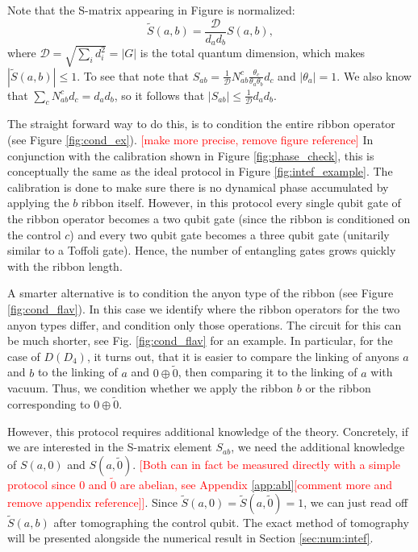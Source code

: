 \documentclass[two column]{article}
\newcommand{\caro}[1]{\textcolor{red}{[#1]}}
\begin{document}
Note that the S-matrix appearing in Figure is normalized:
\begin{equation}
    \tilde{S}(a,b) = \frac{\mathcal D}{d_a d_b}S(a,b),
\end{equation}
where $\mathcal D=\sqrt{\sum_i d_i^2}=|G|$ is the total quantum dimension,
which makes $|\tilde{S}(a,b)| \leq 1$. To see that note that $S_{ab}=\frac{1}{\mathcal D} N_{ab}^c \frac{\theta_c}{\theta_a \theta_b} d_c$ and $|\theta_a|=1$. We also know that $\sum_c N_{ab}^c d_c = d_a d_b$, so it follows that $|S_{ab}| \leq \frac{1}{\mathcal D} d_a d_b$.



The straight forward way to do this, is to condition the entire ribbon operator (see Figure \ref{fig:cond_ex}).  \caro{make more precise, remove figure reference} In conjunction with the calibration shown in Figure \ref{fig:phase_check}, this is conceptually the same as the ideal protocol in Figure \ref{fig:intef_example}. 
The calibration is done to make sure there is no dynamical phase accumulated by applying the $b$ ribbon itself.
However, in this protocol every single qubit gate of the ribbon operator becomes a two qubit gate (since the ribbon is conditioned on the control $c$) and every two qubit gate becomes a three qubit gate (unitarily similar to a Toffoli gate). Hence, the number of entangling gates grows quickly with the ribbon length.

A smarter alternative is to condition the anyon type of the ribbon (see Figure \ref{fig:cond_flav}). In this case we identify where the ribbon operators for the two anyon types differ, and condition only those operations. The circuit for this can be much shorter, see Fig. \ref{fig:cond_flav} for an example. In particular, for the case of $D(D_4)$, it turns out, that it is easier to compare the linking of anyons $a$ and $b$ to the linking of $a$ and $0 \oplus \tilde 0$, then comparing it to the linking of $a$ with vacuum. Thus, we condition whether we apply the ribbon $b$ or the ribbon corresponding to $0 \oplus \tilde 0$. 

However, this protocol requires additional knowledge of the theory. Concretely, if we are interested in the S-matrix element $S_{ab}$, we need the additional knowledge of  $S(a, 0)$ and $S(a, \tilde{0})$. \caro{Both can in fact be measured directly with a simple protocol since $0$ and $\tilde{0}$ are abelian, see Appendix \ref{app:abl}[comment more and remove appendix reference]}.
Since $\tilde S(a, 0) = \tilde S(a, \tilde{0}) = 1$, we can just read off $\tilde S(a,b)$ after tomographing the control qubit.
The exact method of tomography will be presented alongside the numerical result in Section \ref{sec:num:intef}. 
\end{document}
